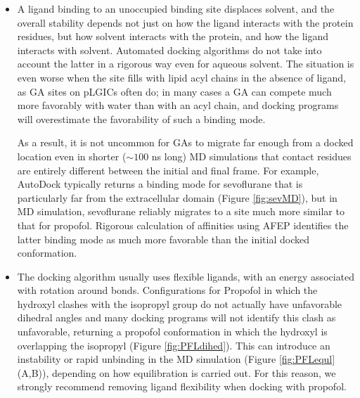 \documentclass[12pt]{article}
\begin{document}
\begin{itemize}
	\item  A ligand binding to an unoccupied binding site displaces solvent, and the overall stability depends not just on how the ligand interacts with the protein residues, but how solvent interacts with the protein, and how the ligand interacts with solvent.  Automated docking algorithms do not take into account the latter in a rigorous way even for aqueous solvent. The situation is even worse when the site fills with lipid acyl chains in the absence of ligand, as GA sites on pLGICs often do;  in many cases a GA can compete much more favorably with water than with an acyl chain, and docking programs will overestimate the favorability of such a binding mode.   %
	
	As a result, it is not uncommon for GAs to migrate far enough from a docked location even in shorter ($\sim 100$ ns long) MD simulations that contact residues are entirely different between the initial and final frame. For example, AutoDock typically returns a binding mode for sevoflurane that is particularly far from the extracellular domain (Figure \ref{fig:sevMD}), but in MD simulation, sevoflurane reliably migrates to a site much more similar to that for propofol.  Rigorous calculation of affinities using AFEP identifies the latter binding mode as much more favorable than the initial docked conformation.  
	
	\item The docking algorithm usually uses flexible ligands, with an energy associated with rotation around bonds.  Configurations for Propofol in which the hydroxyl clashes with the isopropyl group do not actually have unfavorable dihedral angles and many docking programs will not identify this clash as unfavorable, returning a propofol conformation in which the hydroxyl is overlapping the isopropyl (Figure \ref{fig:PFLdihed}).  This can  introduce an instability or rapid unbinding in the MD simulation (Figure \ref{fig:PFLequl} (A,B)), depending on how equilibration is carried out.  For this reason, we strongly recommend removing ligand flexibility when docking with propofol.  
\end{itemize}
 	
\end{document}
